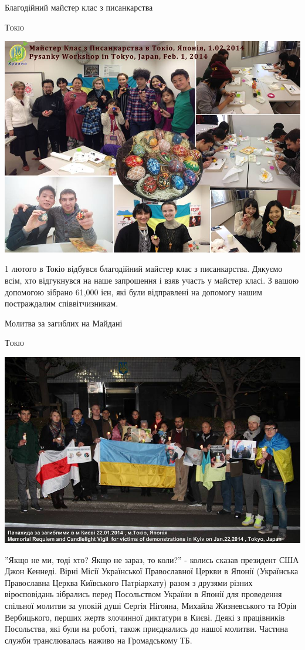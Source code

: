 \documentclass[10pt,a4paper]{article}
\newcommand{\NewsItem}[1]{%
		\usefont{T2A}{iwona}{m}{n} 
		\large #1 \vspace{4pt}
		\par \normalsize \normalfont}
\newcommand{\NewsAuthor}[1]{%
			\hfill \textsc{#1} \vspace{4pt}
			\par \normalfont}
\begin{document}
\newpage
\begin{multicols}{3}
\NewsItem{Благодійний майстер клас з писанкарства}
\NewsAuthor{Токіо}
		\begin{center}
			\includegraphics[width=0.8\linewidth]{images/pysankarstvo}
		\end{center}
1 лютого в Токіо відбувся благодійний майстер клас з писанкарства. 
Дякуємо всім, хто відгукнувся на наше запрошення і взяв участь у майстер класі. З вашою допомогою зібрано 61,000 ієн, які були відправлені на допомогу нашим постраждалим співвітчизникам.

\vfill
\columnbreak
\NewsItem{Молитва за загиблих на Майдані}
\NewsAuthor{Токіо}
		\begin{center}
			\includegraphics[width=0.8\linewidth]{images/molytva-za-zagyblyh}
		\end{center}
''Якщо не ми, тоді хто? Якщо не зараз, то коли?'' - колись сказав президент США Джон Кеннеді. Вірні Місії Української Православної Церкви в Японії (Українська Православна Церква Київського Патріархату) разом з друзями різних віросповідань зібрались перед Посольством України в Японії для проведення спільної молитви за упокій душі Сергія Нігояна, Михайла Жизневського та Юрія Вербицького, перших жертв злочинної диктатури в Києві. Деякі з працівників Посольства, які були на роботі, також приєднались до нашої молитви. Частина служби транслювалась наживо на Громадському ТБ.


\end{multicols}
\end{document}
